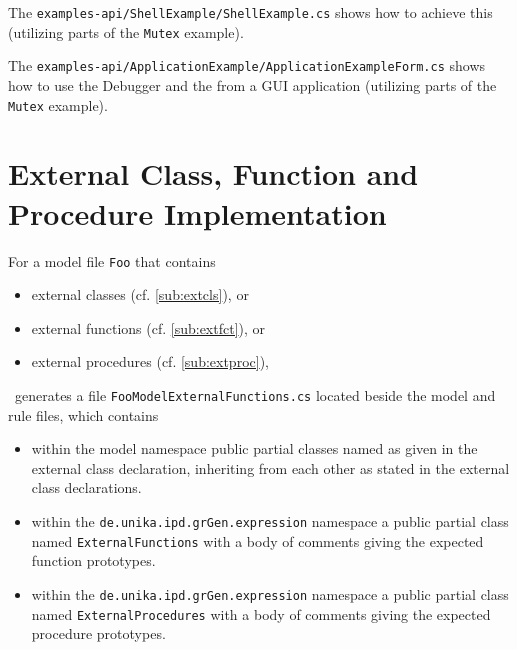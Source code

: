 The \texttt{examples-api/ShellExample/ShellExample.cs} shows how to achieve this (utilizing parts of the \texttt{Mutex} example).

The \texttt{examples-api/ApplicationExample/ApplicationExampleForm.cs} shows how to use the Debugger and the \GrShell{} from a GUI application (utilizing parts of the \texttt{Mutex} example).


\section{External Class, Function and Procedure Implementation}\label{sub:extclsfctimpl}

For a model file \texttt{Foo} that contains 
\begin{itemize}
	\item external classes (cf. \ref{sub:extcls}), or
	\item external functions (cf. \ref{sub:extfct}), or 
	\item external procedures (cf. \ref{sub:extproc}), 
\end{itemize}
\GrG~generates a file \texttt{FooModelExternalFunctions.cs} located beside the model and rule files, which contains
\begin{itemize}
	\item within the model namespace public partial classes named as given in the external class declaration,
inheriting from each other as stated in the external class declarations.
	\item within the \texttt{de.unika.ipd.grGen.expression} namespace a public partial class named \texttt{ExternalFunctions} with a body of comments giving the expected function prototypes.
	\item within the \texttt{de.unika.ipd.grGen.expression} namespace a public partial class named \texttt{ExternalProcedures} with a body of comments giving the expected procedure prototypes.
\end{itemize}

\pagebreak

